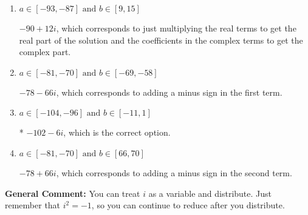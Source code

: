 \documentclass{extbook}[14pt]
\begin{document}
\begin{enumerate}
{\begin{enumerate}[label=\Alph*.]
 $-102 + 6 i$, which corresponds to adding a minus sign in both terms.
\item \( a \in [-93, -87] \text{ and } b \in [9, 15] \)

 $-90 + 12 i$, which corresponds to just multiplying the real terms to get the real part of the solution and the coefficients in the complex terms to get the complex part.
\item \( a \in [-81, -70] \text{ and } b \in [-69, -58] \)

 $-78 - 66 i$, which corresponds to adding a minus sign in the first term.
\item \( a \in [-104, -96] \text{ and } b \in [-11, 1] \)

* $-102 - 6 i$, which is the correct option.
\item \( a \in [-81, -70] \text{ and } b \in [66, 70] \)

 $-78 + 66 i$, which corresponds to adding a minus sign in the second term.
\end{enumerate}

\textbf{General Comment:} You can treat $i$ as a variable and distribute. Just remember that $i^2=-1$, so you can continue to reduce after you distribute.
}
\end{enumerate}
\end{document}
